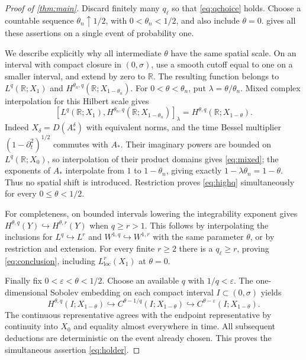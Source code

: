\documentclass[11pt]{amsart}
\theoremstyle{definition}
\theoremstyle{remark}
\newcommand{\R}{\mathbb R}
\newcommand{\loc}{\mathrm{loc}}
\numberwithin{equation}{section}
\begin{document}
\begin{proof}[Proof of \cref{thm:main}]
Discard finitely many $q_\ell$ so that \eqref{eq:qchoice} holds.
Choose a countable sequence $\theta_n\uparrow1/2$, with
$0<\theta_n<1/2$, and also include $\theta=0$.
 gives all these assertions on a single event of
probability one.

We describe explicitly why all intermediate $\theta$ have the same
spatial scale. On an interval with compact closure in $(0,\sigma)$,
use a smooth cutoff equal to one on a smaller interval, and extend
by zero to $\R$. The resulting function belongs to
$L^q(\R;X_1)$ and $H^{\theta_n,q}(\R;X_{1-\theta_n})$.
For $0<\theta<\theta_n$, put $\lambda=\theta/\theta_n$. Mixed
complex interpolation for this Hilbert scale gives
\begin{equation}\label{eq:mixed}
 [L^q(\R;X_1),H^{\theta_n,q}(\R;X_{1-\theta_n})]_\lambda
 =H^{\theta,q}(\R;X_{1-\theta}).
\end{equation}
Indeed $X_\delta=D(A_*^\delta)$ with equivalent norms, and the
time Bessel multiplier $(1-\partial_t^2)^{1/2}$ commutes with $A_*$.
Their imaginary powers are bounded on $L^q(\R;X_0)$, so interpolation
of their product domains gives \eqref{eq:mixed}; the exponents of
$A_*$ interpolate from $1$ to $1-\theta_n$, giving exactly
$1-\lambda\theta_n=1-\theta$. Thus no spatial shift is introduced.
Restriction proves \eqref{eq:highq} simultaneously for every
$0\le\theta<1/2$.

For completeness, on bounded intervals lowering the integrability
exponent gives $H^{\theta,q}(Y)\hookrightarrow H^{\theta,r}(Y)$
when $q\ge r>1$. This follows by interpolating the inclusions for
$L^q\hookrightarrow L^r$ and $W^{1,q}\hookrightarrow W^{1,r}$
with the same parameter $\theta$, or by restriction and extension.
For every finite $r\ge2$ there is a $q_\ell\ge r$, proving
\eqref{eq:conclusion}, including $L^r_\loc(X_1)$ at $\theta=0$.

Finally fix $0<\varepsilon<\theta<1/2$. Choose an available $q$
with $1/q<\varepsilon$. The one-dimensional Sobolev embedding on
each compact interval $I\subset(0,\sigma)$ yields
\[
 H^{\theta,q}(I;X_{1-\theta})
 \hookrightarrow C^{\theta-1/q}(I;X_{1-\theta})
 \hookrightarrow C^{\theta-\varepsilon}(I;X_{1-\theta}).
\]
The continuous representative agrees with the endpoint representative
by continuity into $X_0$ and equality almost everywhere in time.
All subsequent deductions are deterministic on the event already
chosen. This proves the simultaneous assertion \eqref{eq:holder}.
\end{proof}
\end{document}
